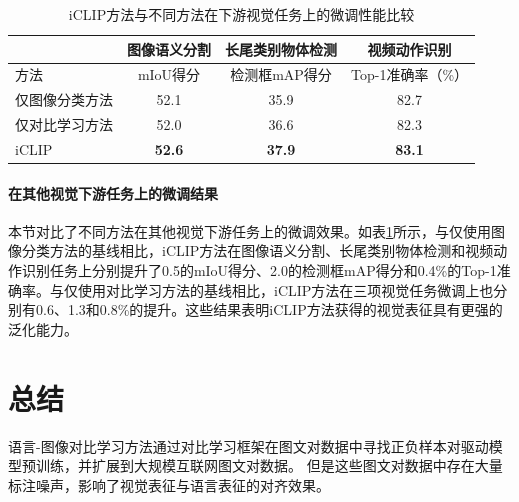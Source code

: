\begin{table}
  \centering
    \caption{iCLIP方法与不同方法在下游视觉任务上的微调性能比较}
  \begin{tabular}{lccc}
    \toprule
    \multicolumn{1}{c}{} & \multicolumn{1}{c}{图像语义分割} & \multicolumn{1}{c}{长尾类别物体检测} & \multicolumn{1}{c}{视频动作识别}\\
    \midrule
  方法 & mIoU得分 & 检测框mAP得分 & Top-1准确率（\%）\\
    \midrule
    仅图像分类方法 & 52.1 & 35.9 & 82.7 \\
    仅对比学习方法 & 52.0 & 36.6 & 82.3 \\
    iCLIP &\textbf{52.6} & \textbf{37.9} & \textbf{83.1} \\
    \bottomrule
  \end{tabular}

  \label{tab:iclip-overall-transfer}
\end{table}

\paragraph{在其他视觉下游任务上的微调结果} 本节对比了不同方法在其他视觉下游任务上的微调效果。如表\ref{tab:iclip-overall-transfer}所示，与仅使用图像分类方法的基线相比，iCLIP方法在图像语义分割、长尾类别物体检测和视频动作识别任务上分别提升了0.5的mIoU得分、2.0的检测框mAP得分和0.4\%的Top-1准确率。与仅使用对比学习方法的基线相比，iCLIP方法在三项视觉任务微调上也分别有0.6、1.3和0.8\%的提升。这些结果表明iCLIP方法获得的视觉表征具有更强的泛化能力。


\section{总结}
\label{sec:iclip-summary}
语言-图像对比学习方法通过对比学习框架在图文对数据中寻找正负样本对驱动模型预训练，并扩展到大规模互联网图文对数据。
但是这些图文对数据中存在大量标注噪声，影响了视觉表征与语言表征的对齐效果。

